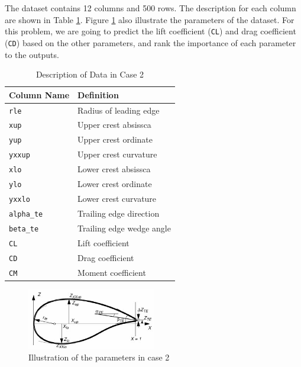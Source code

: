 \documentclass[conf]{new-aiaa}
\begin{document}
The dataset contains 12 columns and 500 rows. The description for each column are shown in Table \ref{tab:case2_data_info}. Figure \ref{fig:case2_problem} also illustrate the parameters of the dataset. For this problem, we are going to predict the lift coefficient (\texttt{CL}) and drag coefficient (\texttt{CD}) based on the other parameters, and rank the importance of each parameter to the outputs.
\begin{table}[H]
    \centering

    \caption{\label{tab:case2_data_info}Description of Data in Case 2}
    \begin{tabular}{l|l}
        \toprule
        Column Name & Definition \\
        \midrule
        \texttt{rle} & Radius of leading edge \\
        \texttt{xup} & Upper crest absissca \\
        \texttt{yup} & Upper crest ordinate \\
        \texttt{yxxup} & Upper crest curvature \\
        \texttt{xlo} & Lower crest absissca \\
        \texttt{ylo} & Lower crest ordinate \\
        \texttt{yxxlo} & Lower crest curvature \\
        \texttt{alpha\_te} & Trailing edge direction \\
        \texttt{beta\_te} & Trailing edge wedge angle \\
        \texttt{CL} & Lift coefficient \\
        \texttt{CD} & Drag coefficient \\
        \texttt{CM} & Moment coefficient \\
        \bottomrule
    \end{tabular}
\end{table}
\begin{figure}
    \centering
    \includegraphics[width=0.5\textwidth]{graph/case2_problem.jpg}
    \caption{\label{fig:case2_problem} Illustration of the parameters in case 2}
\end{figure}
\end{document}
